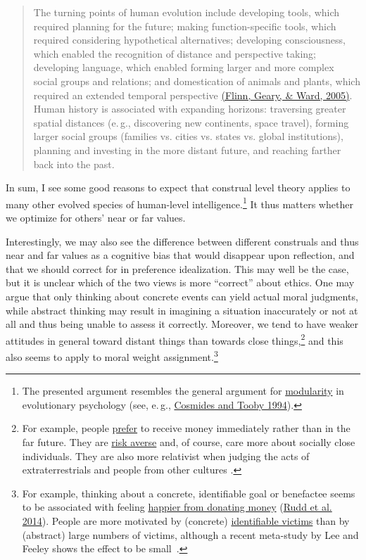 \begin{quote}
The turning points of human evolution include developing tools, which
required planning for the future; making function-specific tools, which
required considering hypothetical alternatives; developing
consciousness, which enabled the recognition of distance and perspective
taking; developing language, which enabled forming larger and more
complex social groups and relations; and domestication of animals and
plants, which required an extended temporal perspective
\href{http://web.missouri.edu/~gearyd/Flinnetal2005.pdf}{(Flinn,
Geary, \& Ward, 2005)}. Human history is associated with expanding
horizons: traversing greater spatial distances (e.\,g., discovering new
continents, space travel), forming larger social groups (families vs.
cities vs. states vs. global institutions), planning and investing in
the more distant future, and reaching farther back into the past.
\end{quote}

In sum, I see some good reasons to expect that construal level theory
applies to many other evolved species of human-level
intelligence.\footnote{The presented argument resembles the general
  argument for
  \href{https://en.wikipedia.org/wiki/Modularity_of_mind}{modularity}
  in evolutionary psychology (see, e.\,g.,
  \href{http://citeseerx.ist.psu.edu/viewdoc/download?doi=10.1.1.140.7758\&rep=rep1\&type=pdf}{Cosmides
  and Tooby 1994}).} It thus matters whether we optimize for others'
near or far values.

Interestingly, we may also see the difference between different
construals and thus near and far values as a cognitive bias that would
disappear upon reflection, and that we should correct for in preference
idealization. This may well be the case, but it is unclear which of the
two views is more ``correct'' about ethics. One may argue that only
thinking about concrete events can yield actual moral judgments, while
abstract thinking may result in imagining a situation inaccurately or
not at all and thus being unable to assess it correctly. Moreover, we
tend to have weaker attitudes in general toward distant things than
towards close things,\footnote{For example, people
  \href{https://en.wikipedia.org/wiki/Time_preference}{prefer} to
  receive money immediately rather than in the far future. They are
  \href{https://en.wikipedia.org/wiki/Risk_aversion}{risk averse}
  and, of course, care more about socially close individuals. They are
  also more relativist when judging the acts of extraterrestrials and
  people from other cultures \parencite{Sarkissian2011-be}.}
and this also seems to apply to moral weight assignment.\footnote{For
  example, thinking about a concrete, identifiable goal or benefactee
  seems to be associated with feeling
  \href{https://en.wikipedia.org/wiki/Warm-glow_giving}{happier
  from donating money}
  (\href{https://dash.harvard.edu/bitstream/handle/1/12534961/rudd,aaker,norton_getting-the-most-out-of-giving.pdf?sequence=3}{Rudd
  et al. 2014}). People are more motivated by (concrete)
  \href{https://en.wikipedia.org/wiki/Identifiable_victim_effect}{identifiable
  victims} than by (abstract) large numbers of victims, although a
  recent meta-study by Lee and Feeley shows the
  effect to be small~\citeyear{Lee2016-lb}.}

